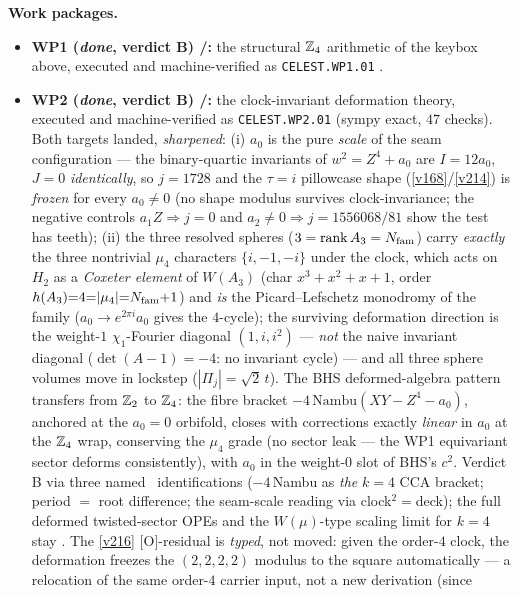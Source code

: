 \par\smallskip\noindent\textbf{Work packages.}
\begin{itemize}
\item \textbf{WP1 (\emph{done}, verdict B) \mE/\mC:} the structural $\mathbb Z_4$ arithmetic of the
keybox above, executed and machine-verified as \texttt{CELEST.WP1.01}
.
\item \textbf{WP2 (\emph{done}, verdict B) \mE/\mC:} the clock-invariant deformation theory, executed
and machine-verified as \texttt{CELEST.WP2.01} 
(sympy exact, $47$ checks). Both targets landed, \emph{sharpened}: (i) $a_0$ is the pure \emph{scale} of
the seam configuration --- the binary-quartic invariants of $w^2=Z^4{+}a_0$ are $I=12a_0$, $J=0$
\emph{identically}, so $j=1728$ and the $\tau{=}i$ pillowcase shape (\vref{v168}/\vref{v214}) is
\emph{frozen} for every $a_0\neq0$ (no shape modulus survives clock-invariance; the negative controls
$a_1Z\Rightarrow j{=}0$ and $a_2\neq0\Rightarrow j{=}1556068/81$ show the test has teeth); (ii) the three
resolved spheres ($3=\operatorname{rank}A_3=N_{\mathrm{fam}}$) carry \emph{exactly} the three nontrivial $\mu_4$
characters $\{i,-1,-i\}$ under the clock, which acts on $H_2$ as a \emph{Coxeter element} of $W(A_3)$
(char $x^3{+}x^2{+}x{+}1$, order $h(A_3){=}4{=}|\mu_4|{=}N_{\mathrm{fam}}{+}1$) and \emph{is} the Picard--Lefschetz
monodromy of the family ($a_0\to e^{2\pi i}a_0$ gives the $4$-cycle); the surviving deformation direction
is the weight-$1$ $\chi_1$-Fourier diagonal $(1,i,i^2)$ --- \emph{not} the naive invariant diagonal
($\det(A{-}1)={-}4$: no invariant cycle) --- and all three sphere volumes move in lockstep
($|\Pi_j|=\sqrt2\,t$). The BHS deformed-algebra pattern transfers from $\mathbb Z_2$ to $\mathbb Z_4$: the fibre bracket
$-4\,\mathrm{Nambu}(XY{-}Z^4{-}a_0)$, anchored at the $a_0{=}0$ orbifold, closes with corrections exactly
\emph{linear} in $a_0$ at the $\mathbb Z_4$ wrap, conserving the $\mu_4$ grade (no sector leak --- the WP1
equivariant sector deforms consistently), with $a_0$ in the weight-$0$ slot of BHS's $c^2$. Verdict B via
three named \mC\ identifications ($-4\,$Nambu as \emph{the} $k{=}4$ CCA bracket; period $=$ root
difference; the seam-scale reading via clock$^2=$deck); the full deformed twisted-sector OPEs and the
$W(\mu)$-type scaling limit for $k{=}4$ stay \mO. The \vref{v216} $[$O$]$-residual is \emph{typed}, not
moved: given the order-$4$ clock, the deformation freezes the $(2,2,2,2)$ modulus to the square
automatically --- a relocation of the same order-$4$ carrier input, not a new derivation (since

\end{itemize}
